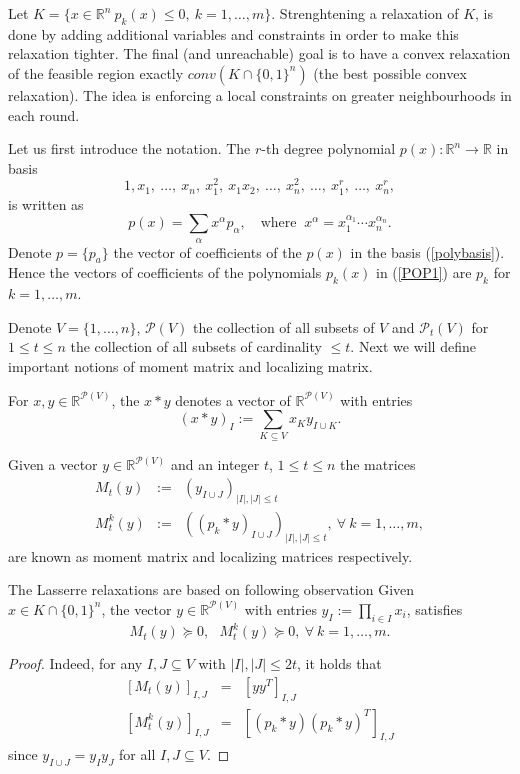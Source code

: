 \documentclass[12pt]{book}
\theoremstyle{definition}
\begin{document}
Let $K = \{ x\in \mathbb{R}^n \ p_k(x)\leq 0, \ k=1,\dots ,m \}$. Strenghtening a relaxation of $K$, is done by adding additional variables and constraints in order to make this relaxation tighter. The final (and unreachable) goal is to have a convex relaxation of the feasible region exactly $conv(K \cap \{0,1\}^n)$ (the best possible convex relaxation).  The idea is enforcing a local constraints on greater neighbourhoods in each round. 

Let us first introduce the notation. The $r$-th degree polynomial $p(x):\mathbb{R}^n\rightarrow\mathbb{R}$ in basis 
\begin{equation}
\label{polybasis}
1,x_1,\ \dots ,\ x_n,\ x_1^2,\ x_1x_2,\ \dots ,\ x_n^2,\ \dots ,\ x_1^r,\ \dots ,\ x_n^r,
\end{equation}
is written as 
$$p(x) = \sum_\alpha x^\alpha p_\alpha, \ \ \ \mbox{ where } \ x^\alpha = x_1^{\alpha_1}\cdots x_n^{\alpha_n}. $$
Denote $p = \{p_a\}$ the vector of coefficients of the $p(x)$ in the basis (\ref{polybasis}). Hence the vectors of coefficients of the polynomials $p_k(x)$ in (\ref{POP1}) are $p_k$ for $k=1,\dots ,m$.

Denote $V = \{ 1,\dots ,n\}$,  $\mathcal{P}(V)$ the collection of all subsets of $V$ and $\mathcal{P}_t(V)$ for $1\leq t\leq n$ the collection of all subsets of cardinality $\leq t$. 
Next we will define important notions of moment matrix and localizing matrix.


For $x,y\in \mathbb{R}^{\mathcal{P}(V)}$, the $x*y$ denotes a vector of $\mathbb{R}^{\mathcal{P}(V)}$
with entries 
\begin{equation*}
(x*y)_I := \sum_{K\subseteq V} x_K y_{I\cup K}.
\end{equation*}

Given a vector $y\in \mathbb{R}^{\mathcal{P}(V)}$  and an integer $t$, $1\leq t\leq n$
the matrices \begin{eqnarray*}
M_t(y) &:=& (y_{I\cup J})_{\vert I\vert ,\vert J\vert \leq t} \\
M_t^k(y) &:=& \left((p_k*y)_{I\cup J}\right)_{\vert I\vert ,\vert J\vert \leq t} , \ \forall \ k=1,\dots ,m,
\end{eqnarray*}
are known as moment matrix and localizing matrices respectively.

The Lasserre relaxations are based on following observation
\lema Given $x\in K\cap \{ 0,1\}^n$, the vector $y\in \mathbb{R}^{\mathcal{P}(V)}$ with entries $y_I:=\prod_{i\in I} x_i$, satisfies $$M_t(y)\succeq 0, \ \ \ M_t^k(y)\succeq 0, \ \forall \ k=1,\dots ,m.$$
\rm
\begin{proof}
Indeed, for any $I,J\subseteq V$ with $\vert I\vert, \vert J\vert \leq 2t$, it holds that
\begin{eqnarray*}
\left[M_t(y)\right]_{I,J} &=& [yy^T]_{I,J} \\
\left[M_t^k(y)\right]_{I,J} &=& \left[(p_k*y)(p_k*y)^T\right]_{I,J}
\end{eqnarray*}
since $y_{I\cup J} = y_I y_J$ for all $I,J\subseteq V$. 
\end{proof}
\end{document}
